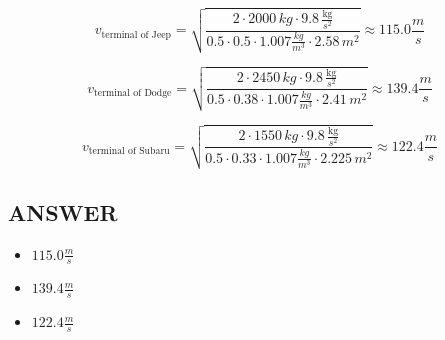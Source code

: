 $$ v_{\text{terminal of Jeep}} = \sqrt{\frac{2 \cdot 2000 \, kg \cdot 9.8 \, \frac{\text{kg}}{s^2}}{0.5 \cdot 0.5 \cdot 1.007 \frac{kg}{m^3} \cdot 2.58 \, m^2}} \approx \boxed{115.0 \frac{m}{s}}$$

$$ v_{\text{terminal of Dodge}} = \sqrt{\frac{2 \cdot 2450 \, kg \cdot 9.8 \, \frac{\text{kg}}{s^2}}{0.5 \cdot 0.38 \cdot 1.007 \frac{kg}{m^3} \cdot 2.41 \, m^2}}  \approx 139.4 \frac{m}{s}$$ 

$$ v_{\text{terminal of Subaru}} = \sqrt{\frac{2 \cdot 1550 \, kg \cdot 9.8 \, \frac{\text{kg}}{s^2}}{0.5 \cdot 0.33 \cdot 1.007 \frac{kg}{m^3} \cdot 2.225 \, m^2}} \approx 122.4 \frac{m}{s}$$ 


\vfill \subsection*{ANSWER}
\begin{itemize}
    \item $115.0 \frac{m}{s}$
    \item $139.4 \frac{m}{s}$
    \item $122.4 \frac{m}{s}$
\end{itemize}

